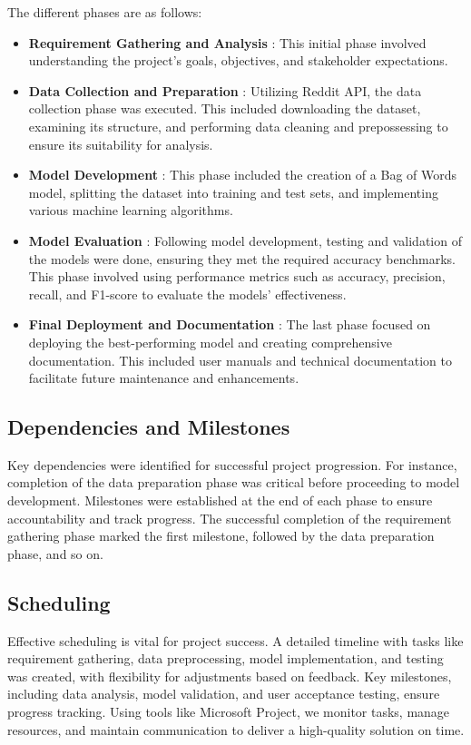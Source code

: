 \noindent
The different phases are as follows:

\begin{itemize}
    \item \textbf{Requirement Gathering and Analysis} :
    \noindent
    This initial phase involved understanding the project's goals, objectives, and stakeholder expectations.
    \item \textbf{Data Collection and Preparation} :
    \noindent
    Utilizing Reddit API, the data collection phase was executed. This included downloading the dataset, examining its structure, and performing data cleaning and prepossessing to ensure its suitability for analysis.
    \item \textbf{Model Development} :
    \noindent
    This phase included the creation of a Bag of Words model, splitting the dataset into training and test sets, and implementing various machine learning algorithms.
    \item \textbf{Model Evaluation} :
    \noindent
    Following model development, testing and validation of the models were done, ensuring they met the required accuracy benchmarks. This phase involved using performance metrics such as accuracy, precision, recall, and F1-score to evaluate the models' effectiveness.
    \item \textbf{Final Deployment and Documentation} :
    \noindent
    The last phase focused on deploying the best-performing model and creating comprehensive documentation. This included user manuals and technical documentation to facilitate future maintenance and enhancements.
\end{itemize}


\subsection{Dependencies and Milestones} 
\noindent
Key dependencies were identified for successful project progression. For instance, completion of the data preparation phase was critical before proceeding to model development. Milestones were established at the end of each phase to ensure accountability and track progress. The successful completion of the requirement gathering phase marked the first milestone, followed by the data preparation phase, and so on.

\subsection{Scheduling}
\noindent
Effective scheduling is vital for project success. A detailed timeline with tasks like requirement gathering, data preprocessing, model implementation, and testing was created, with flexibility for adjustments based on feedback. Key milestones, including data analysis, model validation, and user acceptance testing, ensure progress tracking. Using tools like Microsoft Project, we monitor tasks, manage resources, and maintain communication to deliver a high-quality solution on time.

